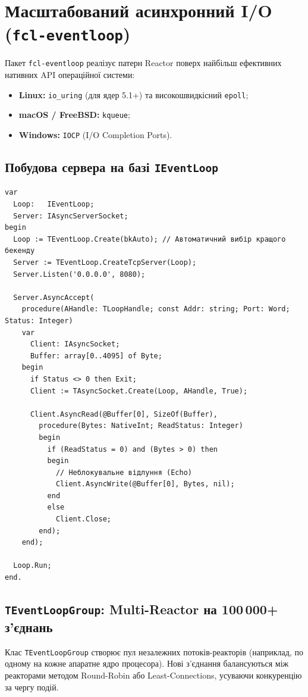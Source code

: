 \documentclass[11pt,a4paper]{article}
\begin{document}
\newpage

\section{Масштабований асинхронний I/O (\texttt{fcl-eventloop})}

Пакет \texttt{fcl-eventloop} реалізує патерн Reactor поверх найбільш ефективних нативних API операційної системи:
\begin{itemize}
  \item \textbf{Linux:} \texttt{io\_uring} (для ядер 5.1+) та високошвидкісний \texttt{epoll};
  \item \textbf{macOS / FreeBSD:} \texttt{kqueue};
  \item \textbf{Windows:} \texttt{IOCP} (I/O Completion Ports).
\end{itemize}

\subsection{Побудова сервера на базі \texttt{IEventLoop}}
\begin{lstlisting}
var
  Loop:   IEventLoop;
  Server: IAsyncServerSocket;
begin
  Loop := TEventLoop.Create(bkAuto); // Автоматичний вибір кращого бекенду
  Server := TEventLoop.CreateTcpServer(Loop);
  Server.Listen('0.0.0.0', 8080);

  Server.AsyncAccept(
    procedure(AHandle: TLoopHandle; const Addr: string; Port: Word; Status: Integer)
    var
      Client: IAsyncSocket;
      Buffer: array[0..4095] of Byte;
    begin
      if Status <> 0 then Exit;
      Client := TAsyncSocket.Create(Loop, AHandle, True);
      
      Client.AsyncRead(@Buffer[0], SizeOf(Buffer),
        procedure(Bytes: NativeInt; ReadStatus: Integer)
        begin
          if (ReadStatus = 0) and (Bytes > 0) then
          begin
            // Неблокувальне відлуння (Echo)
            Client.AsyncWrite(@Buffer[0], Bytes, nil);
          end
          else
            Client.Close;
        end);
    end);

  Loop.Run;
end.
\end{lstlisting}

\subsection{\texttt{TEventLoopGroup}: Multi-Reactor на 100\,000+ з'єднань}
Клас \texttt{TEventLoopGroup} створює пул незалежних потоків-реакторів (наприклад, по одному на кожне апаратне ядро процесора). Нові з'єднання балансуються між реакторами методом Round-Robin або Least-Connections, усуваючи конкуренцію за чергу подій.
\end{document}

